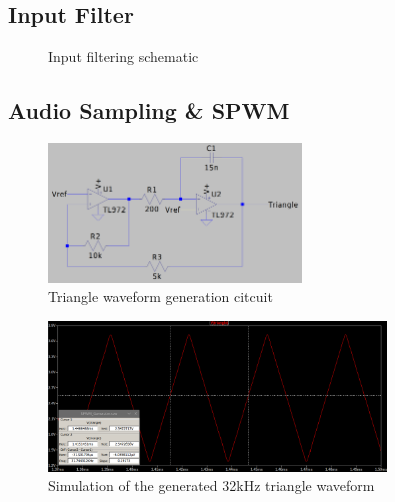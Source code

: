 \documentclass[a4paper,11pt]{article}
\begin{document}
\subsection{Input Filter}

\begin{figure}[h!]
    \centering
    \caption{Input filtering schematic}
\end{figure}

\subsection{Audio Sampling \& SPWM}

\begin{figure}[h!]
    \centering
    \includegraphics[width=0.6\textwidth]{spwm/circuit.png}
    \caption{Triangle waveform generation citcuit}
\end{figure}

\begin{figure}[h!]
    \centering
    \includegraphics[width=0.8\textwidth]{simulation/triangle_wave.png}
    \caption{Simulation of the generated 32kHz triangle waveform}
\end{figure}
\end{document}
